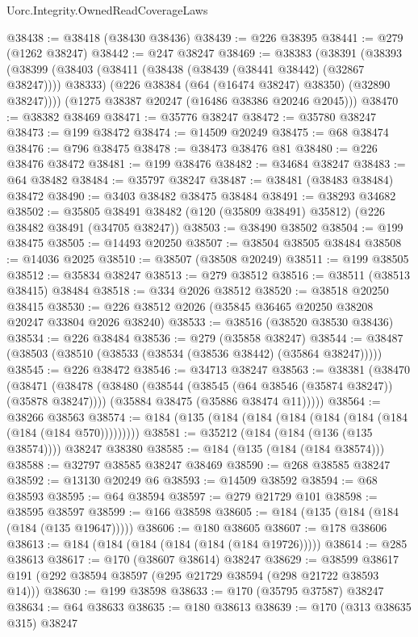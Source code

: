 \begin{lexlean}{Uorc.Integrity.OwnedReadCoverageLaws}
\begin{coremodule}
@38438 := @38418 (@38430 @38436)
@38439 := @226 @38395
@38441 := @279 (@1262 @38247)
@38442 := @247 @38247
@38469 := @38383
    (@38391
      (@38393
        (@38399
          (@38403 (@38411 (@38438 (@38439 (@38441 @38442) (@32867 @38247)))) @38333)
          (@226 @38384 (@64 (@16474 @38247) @38350) (@32890 @38247))))
      (@1275 @38387 @20247 (@16486 @38386 @20246 @2045)))
@38470 := @38382 @38469
@38471 := @35776 @38247
@38472 := @35780 @38247
@38473 := @199 @38472
@38474 := @14509 @20249
@38475 := @68 @38474
@38476 := @796 @38475
@38478 := @38473 @38476 @81
@38480 := @226 @38476 @38472
@38481 := @199 @38476
@38482 := @34684 @38247
@38483 := @64 @38482
@38484 := @35797 @38247
@38487 := @38481 (@38483 @38484) @38472
@38490 := @3403 @38482 @38475 @38484
@38491 := @38293 @34682
@38502 := @35805 @38491 @38482 (@120 (@35809 @38491) @35812) (@226 @38482 @38491 (@34705 @38247))
@38503 := @38490 @38502
@38504 := @199 @38475
@38505 := @14493 @20250
@38507 := @38504 @38505 @38484
@38508 := @14036 @2025
@38510 := @38507 (@38508 @20249)
@38511 := @199 @38505
@38512 := @35834 @38247
@38513 := @279 @38512
@38516 := @38511 (@38513 @38415) @38484
@38518 := @334 @2026 @38512
@38520 := @38518 @20250 @38415
@38530 := @226 @38512 @2026 (@35845 @36465 @20250 @38208 @20247 @33804 @2026 @38240)
@38533 := @38516 (@38520 @38530 @38436)
@38534 := @226 @38484
@38536 := @279 (@35858 @38247)
@38544 := @38487 (@38503 (@38510 (@38533 (@38534 (@38536 @38442) (@35864 @38247)))))
@38545 := @226 @38472
@38546 := @34713 @38247
@38563 := @38381
    (@38470
      (@38471
        (@38478
          (@38480 (@38544 (@38545 (@64 @38546 (@35874 @38247)) (@35878 @38247))))
          (@35884 @38475 (@35886 @38474 @11)))))
@38564 := @38266 @38563
@38574 := @184 (@135 (@184 (@184 (@184 (@184 (@184 (@184 (@184 (@184 @570)))))))))
@38581 := @35212 (@184 (@184 (@136 (@135 @38574)))) @38247 @38380
@38585 := @184 (@135 (@184 (@184 @38574)))
@38588 := @32797 @38585 @38247 @38469
@38590 := @268 @38585 @38247
@38592 := @13130 @20249 @6
@38593 := @14509 @38592
@38594 := @68 @38593
@38595 := @64 @38594
@38597 := @279 @21729 @101
@38598 := @38595 @38597
@38599 := @166 @38598
@38605 := @184 (@135 (@184 (@184 (@184 (@135 @19647)))))
@38606 := @180 @38605
@38607 := @178 @38606
@38613 := @184 (@184 (@184 (@184 (@184 (@184 @19726)))))
@38614 := @285 @38613
@38617 := @170 (@38607 @38614) @38247
@38629 := @38599 @38617 @191 (@292 @38594 @38597 (@295 @21729 @38594 (@298 @21722 @38593 @14)))
@38630 := @199 @38598
@38633 := @170 (@35795 @37587) @38247
@38634 := @64 @38633
@38635 := @180 @38613
@38639 := @170 (@313 @38635 @315) @38247

\end{coremodule}
\end{lexlean}
